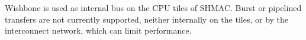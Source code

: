 Wishbone is used as internal bus on the CPU tiles of SHMAC. Burst or pipelined transfers are
not currently supported, neither internally on the tiles, or by the interconnect network, which can limit performance.




%
